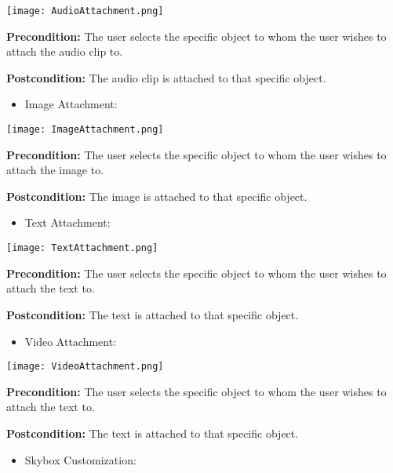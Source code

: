 \begin{flushleft}
	\begin{center}
	\texttt{[image: AudioAttachment.png]}
	\end{center}

	\textbf{Precondition:} The user selects the specific object to whom the user wishes to attach the audio clip to.

	\textbf{Postcondition:} The audio clip is attached to that specific object.

	\begin{itemize}
		\item Image Attachment:
	\end{itemize}

	\begin{center}
	\texttt{[image: ImageAttachment.png]}
	\end{center}

	\textbf{Precondition:} The user selects the specific object to whom the user wishes to attach the image to.

	\textbf{Postcondition:} The image is attached to that specific object.

	\begin{itemize}
		\item Text Attachment:
	\end{itemize}

	\begin{center}
	\texttt{[image: TextAttachment.png]}
	\end{center}

	\textbf{Precondition:} The user selects the specific object to whom the user wishes to attach the text to.

	\textbf{Postcondition:} The text is attached to that specific object.

	\begin{itemize}
		\item Video Attachment:
	\end{itemize}

	\begin{center}
	\texttt{[image: VideoAttachment.png]}
	\end{center}

	\textbf{Precondition:} The user selects the specific object to whom the user wishes to attach the text to.

	\textbf{Postcondition:} The text is attached to that specific object.

	\begin{itemize}
		\item Skybox Customization:
	\end{itemize}


\end{flushleft}
